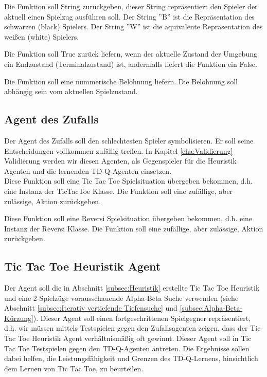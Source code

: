 Die Funktion soll String zurückgeben, dieser String repräsentiert den Spieler der aktuell einen Spielzug ausführen soll. Der String ''B'' ist die Repräsentation des schwarzen (black) Spielers. Der String ''W'' ist die äquivalente Repräsentation des weißen (white) Spielers.

Die Funktion soll True zurück liefern, wenn der aktuelle Zustand der Umgebung ein Endzustand (Terminalzustand) ist, andernfalls liefert die Funktion ein False.

Die Funktion soll eine nummerische Belohnung liefern. Die Belohnung soll abhängig sein vom aktuellen Spielzustand.

\subsection{Agent des Zufalls}
Der Agent des Zufalls soll den schlechtesten Spieler symbolisieren. Er soll seine Entscheidungen vollkommen zufällig treffen. In Kapitel \ref{cha:Validierung} Validierung werden wir diesen Agenten, als Gegenspieler für die Heuristik Agenten und die lernenden TD-Q-Agenten einsetzen. \\

Diese Funktion soll eine Tic Tac Toe Spielsituation übergeben bekommen, d.h. eine Instanz der TicTacToe Klasse. Die Funktion soll eine zufällige, aber zulässige, Aktion zurückgeben.

Diese Funktion soll eine Reversi Spielsituation übergeben bekommen, d.h. eine Instanz der Reversi Klasse. Die Funktion soll eine zufällige, aber zulässige, Aktion zurückgeben.

\subsection{Tic Tac Toe Heuristik Agent}
Der Agent soll die in Abschnitt \ref{subsec:Heuristik} erstellte Tic Tac Toe Heuristik und eine 2-Spielzüge vorausschauende Alpha-Beta Suche verwenden (siehe Abschnitt \ref{subsec:Iterativ vertiefende Tiefensuche} und \ref{subsec:Alpha-Beta-Kürzung}). Dieser Agent soll einen fortgeschrittenen Spielgegner repräsentiert, d.h. wir müssen mittels Testspielen gegen den Zufallsagenten zeigen, dass der Tic Tac Toe Heuristik Agent verhältnismäßig oft gewinnt. Dieser Agent soll in Tic Tac Toe Testspielen gegen den TD-Q-Agenten antreten. Die Ergebnisse sollen dabei helfen, die Leistungsfähigkeit und Grenzen des TD-Q-Lernens, hinsichtlich dem Lernen von Tic Tac Toe, zu beurteilen. 

